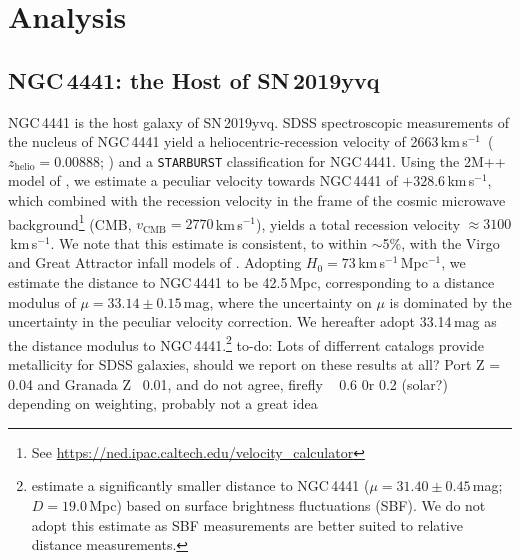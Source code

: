 \documentclass[twocolumn]{aastex63}
\newcommand{\todo}[1]{{\color{magenta} to-do: {#1}}}
\newcommand{\kms}{km\,s$^{-1}$}
\newcommand{\sn}{SN\,2019yvq}
\begin{document}
\section{Analysis}\label{sec:analysis}

\subsection{NGC\,4441: the Host of \sn}\label{sec:host}

NGC\,4441 is the host galaxy of \sn. SDSS spectroscopic measurements of the
nucleus of NGC\,4441 yield a heliocentric-recession velocity of 2663\,\kms\
($z_\mathrm{helio} = 0.00888$; \citealt{Abolfathi18}) and a \texttt{STARBURST}
classification for NGC\,4441. Using the 2M++ model of \citet{Carrick15}, we
estimate a peculiar velocity towards NGC\,4441 of $+328.6$\,\kms, which
combined with the recession velocity in the frame of the cosmic microwave
background\footnote{See
\url{https://ned.ipac.caltech.edu/velocity_calculator}} (CMB, $v_\mathrm{CMB}
= 2770$\,\kms), yields a total recession velocity $\approx 3100$\,\kms. We
note that this estimate is consistent, to within $\sim$5\%, with the Virgo and
Great Attractor infall models of \citet{Mould00}. Adopting $H_0 =
73$\,\kms\,Mpc$^{-1}$, we estimate the distance to NGC\,4441 to be 42.5\,Mpc,
corresponding to a distance modulus of $\mu = 33.14 \pm 0.15$\,mag, where the
uncertainty on $\mu$ is dominated by the uncertainty in the peculiar velocity
correction. We hereafter adopt 33.14\,mag as the distance modulus to
NGC\,4441.\footnote{\citet{Tonry01} estimate a significantly smaller distance
to NGC\,4441 ($\mu = 31.40 \pm 0.45$\,mag; $D = 19.0$\,Mpc) based on surface
brightness fluctuations (SBF). We do not adopt this estimate as SBF
measurements are better suited to relative distance measurements.} \todo{Lots
of differrent catalogs provide metallicity for SDSS galaxies, should we report
on these results at all? Port Z = 0.04 and Granada Z ~0.01, and do not agree,
firefly ~ 0.6 0r 0.2 (solar?) depending on weighting, probably not a great
idea}
\end{document}
